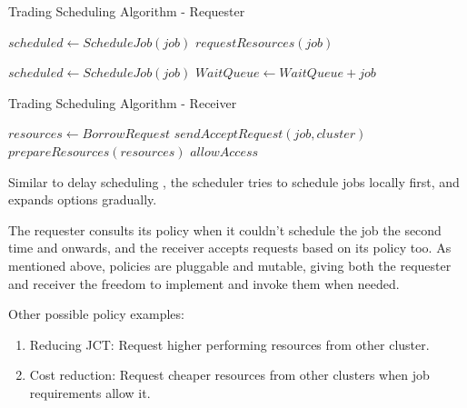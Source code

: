 \begin{algorithm}[H]
\caption{Trading Scheduling Algorithm - Requester}
\begin{algorithmic}
        \State $scheduled \gets ScheduleJob(job)$
        \State $requestResources(job)$
        \EndIf
    \EndFor

        \State $scheduled \gets ScheduleJob(job)$
        \State $WaitQueue \gets WaitQueue + job$
        \EndIf
    \EndFor
\end{algorithmic}
\end{algorithm}

\begin{algorithm}[H]
    \caption{Trading Scheduling Algorithm - Receiver}
    \begin{algorithmic}
            \State $ resources \gets BorrowRequest $  
            \State $sendAcceptRequest(job, cluster)$
            \State $prepareResources(resources)$
            \State $allowAccess$
            \EndIf
    \end{algorithmic}
\end{algorithm} 

Similar to delay scheduling \cite{zaharia_delay_2010}, the scheduler tries to schedule jobs locally first, and 
expands options gradually. 

The requester consults its policy when it couldn't schedule the job the second time and onwards, and the receiver 
accepts requests based on its policy too. As mentioned above, policies are pluggable and mutable, giving both the requester 
and receiver the freedom to implement and invoke them when needed.

Other possible policy examples:
\begin{enumerate}
    \item Reducing JCT: Request higher performing resources from other cluster. \label{jct} 
    \item Cost reduction: Request cheaper resources from other clusters when job requirements allow it. \label{cost} 
\end{enumerate}